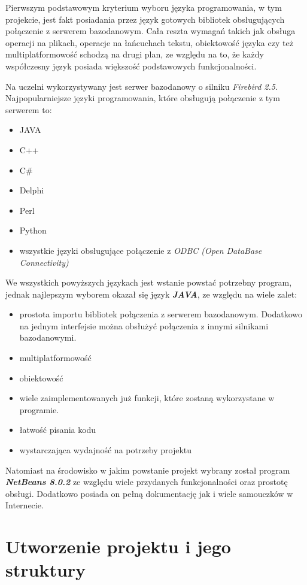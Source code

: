 Pierwszym podstawowym kryterium wyboru języka programowania, w tym projekcie, jest fakt posiadania przez język gotowych bibliotek obsługujących połączenie z serwerem bazodanowym. Cała reszta wymagań takich jak obsługa operacji na plikach, operacje na łańcuchach tekstu, obiektowość języka czy też multiplatformowość schodzą na drugi plan, ze względu na to, że każdy współczesny język posiada większość podstawowych funkcjonalności. 
\par Na uczelni wykorzystywany jest serwer bazodanowy o silniku \emph{Firebird 2.5}. Najpopularniejsze języki programowania, które obsługują połączenie z tym serwerem to:
\begin{itemize}
\item JAVA
\item C++
\item C\#
\item Delphi
\item Perl
\item Python
\item wszystkie języki obsługujące połączenie z \emph{ODBC (Open DataBase Connectivity)} 
\end{itemize}
\vspace{5mm}
We wszystkich powyższych językach jest wstanie powstać potrzebny program, jednak najlepszym wyborem okazał się język \emph{\textbf{JAVA}}, ze względu na wiele zalet:
\begin{itemize}
\item prostota importu bibliotek połączenia z serwerem bazodanowym. Dodatkowo na jednym interfejsie można obsłużyć połączenia z innymi silnikami bazodanowymi.
\item multiplatformowość
\item obiektowość
\item wiele zaimplementowanych już funkcji, które zostaną wykorzystane w programie.
\item łatwość pisania kodu
\item wystarczająca wydajność na potrzeby projektu
\end{itemize}
\vspace{5mm}
\par
Natomiast na środowisko w jakim powstanie projekt wybrany został program \emph{\textbf{NetBeans 8.0.2 }} ze względu wiele przydanych funkcjonalności oraz  prostotę obsługi. Dodatkowo posiada on pełną dokumentację jak i wiele samouczków w Internecie. 

\section{Utworzenie projektu i jego struktury}

